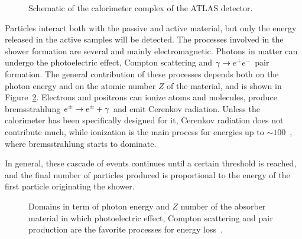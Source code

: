 \begin{figure}[tb]\begin{center}
	\caption{Schematic of the calorimeter complex of the ATLAS detector.\label{fig:calorimeters}}
\end{center}\end{figure}

Particles interact both with the passive and active material, but only the energy released
in the active samples will be detected. 
The processes involved in the shower formation are several and mainly electromagnetic.
Photons in matter can undergo the photoelectric effect, Compton scattering and $\gamma \to \epem$
pair formation. The general contribution of these processes depends both on the photon energy
and on the atomic number $Z$ of the material, and is shown in Figure~\ref{fig:photonsmatter}.
Electrons and positrons can ionize atoms and molecules, produce bremsstrahlung $\epm \to \epm + \gamma$
and emit Cerenkov radiation. Unless the calorimeter has been specifically designed for it,
 Cerenkov radiation does not contribute much, while ionization is the main process for energies
up to $\sim 100$~\mev, where bremsstrahlung starts to dominate.

In general, these cascade of events
continues until a certain threshold is reached, and the final number of particles
produced is proportional to the energy of the first particle originating the shower.

\begin{figure}[tb]\begin{center}
	\caption{Domains in term of photon energy and $Z$ number of the absorber material
        in which photoelectric eﬀect, Compton scattering and pair production are the 
        favorite processes for energy loss~\cite{Wigmans}.\label{fig:photonsmatter}}
\end{center}\end{figure}

